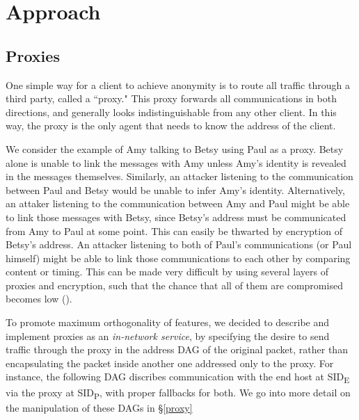 \documentclass{article}
\newcommand{\entrynode}[1]{
  \SetVertexNormal[Shape      = circle,
                   FillColor  = black,
                   LineWidth  = 0pt,
                   MinSize    = 0pt]
  \Vertex[L={\tiny\,}]{#1}
  \SetVertexNormal[Shape      = circle,
                   FillColor  = white,
                   LineWidth  = 2pt]
}
\begin{document}
\section{Approach}
\label{approach}

\subsection{Proxies}
\label{proxies}
One simple way for a client to achieve anonymity is to route all traffic through a third party, called a ``proxy."  This proxy forwards all communications in both directions, and generally looks indistinguishable from any other client.  In this way, the proxy is the only agent that needs to know the address of the client.  

We consider the example of Amy talking to Betsy using Paul as a proxy.  Betsy alone is unable to link the messages with Amy unless Amy's identity is revealed in the messages themselves.  Similarly, an attacker listening to the communication between Paul and Betsy would be unable to infer Amy's identity.  Alternatively, an attaker listening to the communication between Amy and Paul might be able to link those messages with Betsy, since Betsy's address must be communicated from Amy to Paul at some point.  This can easily be thwarted by encryption of Betsy's address.  An attacker listening to both of Paul's communications (or Paul himself) might be able to link those communications to each other by comparing content or timing.  This can be made very difficult by using several layers of proxies and encryption, such that the chance that all of them are compromised becomes low (\cite{onion}).

To promote maximum orthogonality of features, we decided to describe and implement proxies as an {\em in-network service}, by specifying the desire to send traffic through the proxy in the address DAG of the original packet, rather than encapsulating the packet inside another one addressed only to the proxy.  For instance, the following DAG discribes communication with the end host at SID\textsubscript{E} via the proxy at SID\textsubscript{P}, with proper fallbacks for both.  We go into more detail on the manipulation of these DAGs in \S\ref{proxy}
\begin{center}
\end{center}
\end{document}
